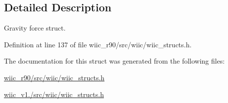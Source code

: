 \subsection{Detailed Description}
Gravity force struct. 

Definition at line 137 of file wiic\-\_\-r90/src/wiic/wiic\-\_\-structs.\-h.



The documentation for this struct was generated from the following files\-:\begin{DoxyCompactItemize}
\item 
\hyperlink{wiic__r90_2src_2wiic_2wiic__structs_8h}{wiic\-\_\-r90/src/wiic/wiic\-\_\-structs.\-h}\item 
\hyperlink{wiic__v1_81_2src_2wiic_2wiic__structs_8h}{wiic\-\_\-v1./src/wiic/wiic\-\_\-structs.\-h}\end{DoxyCompactItemize}
